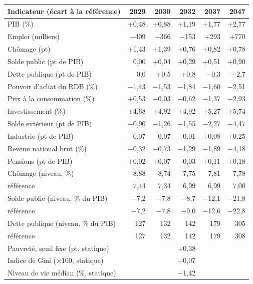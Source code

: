 \begin{tabular}{lrrrrr}
\toprule
Indicateur (écart à la référence) & 2029 & 2030 & 2032 & 2037 & 2047 \\
\midrule
PIB (\%) & +0{,}48 & +0{,}88 & +1{,}19 & +1{,}77 & +2{,}77 \\
Emploi (milliers) & $-$409 & $-$366 & $-$153 & +293 & +770 \\
Chômage (pt) & +1{,}43 & +1{,}39 & +0{,}76 & +0{,}82 & +0{,}78 \\
Solde public (pt de PIB) & 0{,}00 & +0{,}04 & +0{,}29 & +0{,}51 & +0{,}90 \\
Dette publique (pt de PIB) & 0{,}0 & +0{,}5 & +0{,}8 & $-$0{,}3 & $-$2{,}7 \\
Pouvoir d'achat du RDB (\%) & $-$1{,}43 & $-$1{,}53 & $-$1{,}84 & $-$1{,}60 & $-$2{,}51 \\
Prix à la consommation (\%) & +0{,}53 & $-$0{,}03 & $-$0{,}62 & $-$1{,}37 & $-$2{,}93 \\
Investissement (\%) & +4{,}68 & +4{,}92 & +4{,}92 & +5{,}27 & +5{,}74 \\
Solde extérieur (pt de PIB) & $-$0{,}90 & $-$1{,}26 & $-$1{,}55 & $-$2{,}27 & $-$4{,}47 \\
Industrie (pt de PIB) & $-$0{,}07 & $-$0{,}07 & $-$0{,}01 & +0{,}08 & +0{,}25 \\
Revenu national brut (\%) & $-$0{,}32 & $-$0{,}73 & $-$1{,}29 & $-$1{,}89 & $-$4{,}18 \\
Pensions (pt de PIB) & +0{,}02 & +0{,}07 & $-$0{,}03 & +0{,}11 & +0{,}18 \\
\midrule
Chômage (niveau, \%) & 8{,}88 & 8{,}74 & 7{,}75 & 7{,}81 & 7{,}78 \\
\quad référence & 7{,}44 & 7{,}34 & 6{,}99 & 6{,}99 & 7{,}00 \\
Solde public (niveau, \% du PIB) & $-$7{,}2 & $-$7{,}8 & $-$8{,}7 & $-$12{,}1 & $-$21{,}8 \\
\quad référence & $-$7{,}2 & $-$7{,}8 & $-$9{,}0 & $-$12{,}6 & $-$22{,}8 \\
Dette publique (niveau, \% du PIB) & 127 & 132 & 142 & 179 & 305 \\
\quad référence & 127 & 132 & 142 & 179 & 308 \\
\midrule
Pauvreté, seuil fixe (pt, statique) & \multicolumn{5}{c}{+0{,}38} \\
Indice de Gini ($\times$100, statique) & \multicolumn{5}{c}{$-$0{,}07} \\
Niveau de vie médian (\%, statique) & \multicolumn{5}{c}{$-$1{,}42} \\
\bottomrule
\end{tabular}
